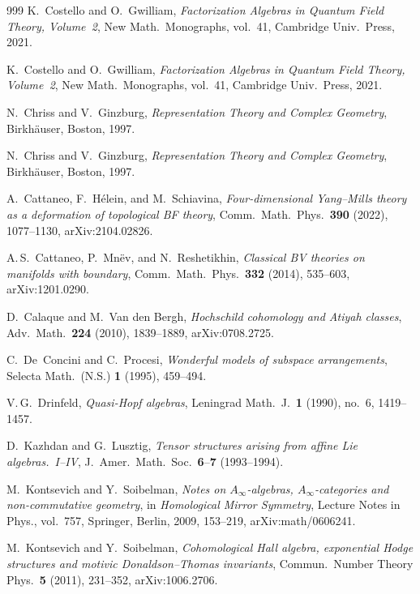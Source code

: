 \documentclass[11pt]{memoir}
\begin{document}
\begin{thebibliography}{999}
K.~Costello and O.~Gwilliam, \emph{Factorization Algebras in Quantum Field Theory, Volume~2}, New Math.\ Monographs, vol.~41, Cambridge Univ.\ Press, 2021.

K.~Costello and O.~Gwilliam, \emph{Factorization Algebras in Quantum Field Theory, Volume~2}, New Math.\ Monographs, vol.~41, Cambridge Univ.\ Press, 2021.

N.~Chriss and V.~Ginzburg, \emph{Representation Theory and Complex Geometry}, Birkh\"auser, Boston, 1997.

N.~Chriss and V.~Ginzburg, \emph{Representation Theory and Complex Geometry}, Birkh\"auser, Boston, 1997.

A.~Cattaneo, F.~H\'elein, and M.~Schiavina, \emph{Four-dimensional Yang--Mills theory as a deformation of topological BF theory}, Comm.\ Math.\ Phys.\ \textbf{390} (2022), 1077--1130, arXiv:2104.02826.

A.\,S.~Cattaneo, P.~Mn\"ev, and N.~Reshetikhin, \emph{Classical BV theories on manifolds with boundary}, Comm.\ Math.\ Phys.\ \textbf{332} (2014), 535--603, arXiv:1201.0290.

D.~Calaque and M.~Van den Bergh, \emph{Hochschild cohomology and Atiyah classes}, Adv.\ Math.\ \textbf{224} (2010), 1839--1889, arXiv:0708.2725.

C.~De~Concini and C.~Procesi, \emph{Wonderful models of subspace arrangements}, Selecta Math.\ (N.S.) \textbf{1} (1995), 459--494.

V.\,G.~Drinfeld, \emph{Quasi-Hopf algebras}, Leningrad Math.\ J.\ \textbf{1} (1990), no.~6, 1419--1457.

D.~Kazhdan and G.~Lusztig, \emph{Tensor structures arising from affine Lie algebras.~I--IV}, J.~Amer.\ Math.\ Soc.\ \textbf{6}--\textbf{7} (1993--1994).

 M.~Kontsevich and Y.~Soibelman, \emph{Notes on $A_\infty$-algebras, $A_\infty$-categories and non-commutative geometry}, in \emph{Homological Mirror Symmetry}, Lecture Notes in Phys., vol.~757, Springer, Berlin, 2009, 153--219, arXiv:math/0606241.

M.~Kontsevich and Y.~Soibelman, \emph{Cohomological Hall algebra, exponential Hodge structures and motivic Donaldson--Thomas invariants}, Commun.\ Number Theory Phys.\ \textbf{5} (2011), 231--352, arXiv:1006.2706.


\end{thebibliography}
\end{document}

